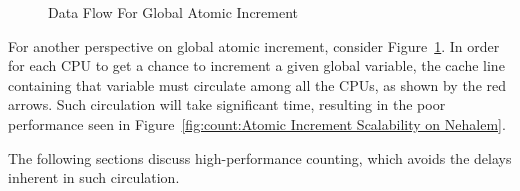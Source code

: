 \begin{figure}[tb]
\begin{center}
\end{center}
\caption{Data Flow For Global Atomic Increment}
\label{fig:count:Data Flow For Global Atomic Increment}
\end{figure}

For another perspective on global atomic increment, consider
Figure~\ref{fig:count:Data Flow For Global Atomic Increment}.
In order for each CPU to get a chance to increment a given
global variable, the cache line containing that variable must
circulate among all the CPUs, as shown by the red arrows.
Such circulation will take significant time, resulting in
the poor performance seen in
Figure~\ref{fig:count:Atomic Increment Scalability on Nehalem}.

The following sections discuss high-performance counting, which
avoids the delays inherent in such circulation.

